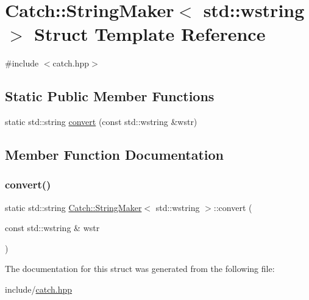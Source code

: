 \hypertarget{struct_catch_1_1_string_maker_3_01std_1_1wstring_01_4}{}\section{Catch\+::String\+Maker$<$ std\+::wstring $>$ Struct Template Reference}
\label{struct_catch_1_1_string_maker_3_01std_1_1wstring_01_4}


{\ttfamily \#include $<$catch.\+hpp$>$}

\subsection*{Static Public Member Functions}
\begin{DoxyCompactItemize}
\item 
static std\+::string \mbox{\hyperlink{struct_catch_1_1_string_maker_3_01std_1_1wstring_01_4_a375d49d6281bee4d36d853fa1bd5ebbd}{convert}} (const std\+::wstring \&wstr)
\end{DoxyCompactItemize}


\subsection{Member Function Documentation}
\mbox{\label{struct_catch_1_1_string_maker_3_01std_1_1wstring_01_4_a375d49d6281bee4d36d853fa1bd5ebbd}} 
\subsubsection{\texorpdfstring{convert()}{convert()}}
{\footnotesize\ttfamily static std\+::string \mbox{\hyperlink{struct_catch_1_1_string_maker}{Catch\+::\+String\+Maker}}$<$ std\+::wstring $>$\+::convert (\begin{DoxyParamCaption}\item[{const std\+::wstring \&}]{wstr }\end{DoxyParamCaption})\hspace{0.3cm}{\ttfamily [static]}}



The documentation for this struct was generated from the following file\+:\begin{DoxyCompactItemize}
\item 
include/\mbox{\hyperlink{catch_8hpp}{catch.\+hpp}}\end{DoxyCompactItemize}
